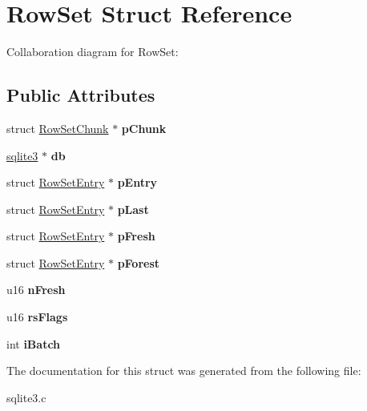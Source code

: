 \hypertarget{structRowSet}{}\section{Row\+Set Struct Reference}
\label{structRowSet}


Collaboration diagram for Row\+Set\+:
\subsection*{Public Attributes}
\begin{DoxyCompactItemize}
\item 
struct \hyperlink{structRowSetChunk}{Row\+Set\+Chunk} $\ast$ {\bfseries p\+Chunk}\hypertarget{structRowSet_af064f9ec7b1ba820a3d53622bde9d42f}{}\label{structRowSet_af064f9ec7b1ba820a3d53622bde9d42f}

\item 
\hyperlink{structsqlite3}{sqlite3} $\ast$ {\bfseries db}\hypertarget{structRowSet_a7da847a06c2f90025fbd89c57516c6f6}{}\label{structRowSet_a7da847a06c2f90025fbd89c57516c6f6}

\item 
struct \hyperlink{structRowSetEntry}{Row\+Set\+Entry} $\ast$ {\bfseries p\+Entry}\hypertarget{structRowSet_a3eccaf69ad7863abae2541a7c0b94e1d}{}\label{structRowSet_a3eccaf69ad7863abae2541a7c0b94e1d}

\item 
struct \hyperlink{structRowSetEntry}{Row\+Set\+Entry} $\ast$ {\bfseries p\+Last}\hypertarget{structRowSet_a040c4b798e6f20d20aa99a45e93b2079}{}\label{structRowSet_a040c4b798e6f20d20aa99a45e93b2079}

\item 
struct \hyperlink{structRowSetEntry}{Row\+Set\+Entry} $\ast$ {\bfseries p\+Fresh}\hypertarget{structRowSet_a7c4e95bd08ff77135068bb3987be5ca1}{}\label{structRowSet_a7c4e95bd08ff77135068bb3987be5ca1}

\item 
struct \hyperlink{structRowSetEntry}{Row\+Set\+Entry} $\ast$ {\bfseries p\+Forest}\hypertarget{structRowSet_abe7ab16fffbe5992f637d6a17c6342ff}{}\label{structRowSet_abe7ab16fffbe5992f637d6a17c6342ff}

\item 
u16 {\bfseries n\+Fresh}\hypertarget{structRowSet_a0ed2a47d6789a70081f3454ef2604e7f}{}\label{structRowSet_a0ed2a47d6789a70081f3454ef2604e7f}

\item 
u16 {\bfseries rs\+Flags}\hypertarget{structRowSet_abfbd103e329e88d0a09ca5a7c9bbd225}{}\label{structRowSet_abfbd103e329e88d0a09ca5a7c9bbd225}

\item 
int {\bfseries i\+Batch}\hypertarget{structRowSet_a90ebc79619b880c1a38b96622ad0ffe0}{}\label{structRowSet_a90ebc79619b880c1a38b96622ad0ffe0}

\end{DoxyCompactItemize}


The documentation for this struct was generated from the following file\+:\begin{DoxyCompactItemize}
\item 
sqlite3.\+c\end{DoxyCompactItemize}
